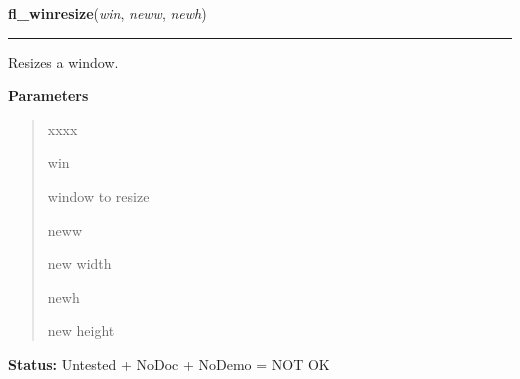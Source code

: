 \hspace{.8\funcindent}\begin{boxedminipage}{\funcwidth}

    \raggedright \textbf{fl\_winresize}(\textit{win}, \textit{neww}, \textit{newh})

    \vspace{-1.5ex}

    \rule{\textwidth}{0.5\fboxrule}
\setlength{\parskip}{2ex}
    Resizes a window.

\setlength{\parskip}{1ex}
      \textbf{Parameters}
      \vspace{-1ex}

      \begin{quote}
        \begin{Ventry}{xxxx}

          \item[win]

          window to resize

          \item[neww]

          new width

          \item[newh]

          new height

        \end{Ventry}

      \end{quote}

\textbf{Status:} Untested + NoDoc + NoDemo = NOT OK



    \end{boxedminipage}

    \label{xformslib:library:fl_winmove}

    \vspace{0.5ex}


